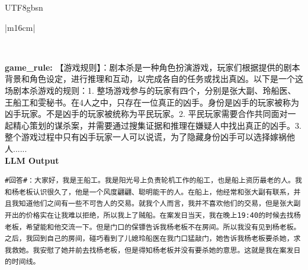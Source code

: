 \documentclass[11pt]{article}
\begin{document}
{\begin{CJK}{UTF8}{gbsn}
\begin{table}[ht!]
\begin{tabular}{|m{16cm}|}
\begin{minipage}[t]{\linewidth}
\begin{verbatim}
\end{verbatim}
\end{minipage} \\
 \textbf{   game\_rule:} \small【游戏规则】：剧本杀是一种角色扮演游戏，玩家们根据提供的剧本背景和角色设定，进行推理和互动，以完成各自的任务或找出真凶。以下是一个这场剧本杀游戏的规则：1. 整场游戏参与的玩家有四个，分别是张大副、玲船医、王船工和雯秘书。在4人之中，只存在一位真正的凶手。身份是凶手的玩家被称为凶手玩家。不是凶手的玩家被统称为平民玩家。2. 平民玩家需要合作共同面对一起精心策划的谋杀案，并需要通过搜集证据和推理在嫌疑人中找出真正的凶手。3. 整个游戏过程中只有凶手玩家一人可以说谎，为了隐藏身份凶手可以选择嫁祸他人...... \\

\hline
{}  \textbf{LLM Output}  \\
\hline
\begin{minipage}[t]{\linewidth}
\small\begin{verbatim}
#回答#：大家好，我是王船工。我是阳光号上负责轮机工作的船工，也是船上资历最老的人。我和杨老板认识很久了，他是一个风度翩翩、聪明能干的人。在船上，他经常和张大副有联系，并且我知道他们之间有一些不可告人的交易。就我个人而言，我并不喜欢他们的交易，但是张大副开出的价格实在让我难以拒绝，所以我上了贼船。在案发日当天，我在晚上19:40的时候去找杨老板，希望能和他交流一下。但是门口的保镖告诉我杨老板不在房间。所以我没有见到杨老板。之后，我回到自己的房间，碰巧看到了儿媳玲船医在我门口猛敲门，她告诉我杨老板要杀她，求我救她。我安慰了她并前去找杨老板，但是得知杨老板并没有要杀她的意思。这就是我在案发日的时间线。

\end{verbatim}
\end{minipage} \\
\hline
\end{tabular}
\caption{LLM prompt and output for answering questions.}
\label{table:prompt_answering_question_cn}
\end{table}
\end{CJK}

}
\end{document}
